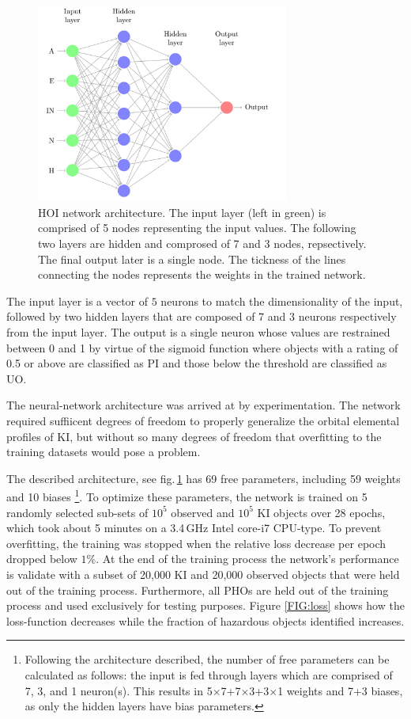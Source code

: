 \documentclass{aa}
\begin{document}
\begin{figure}[t]
    \hspace*{-0.4cm}
	\includegraphics[width=83mm]{images/1_network_hoi.png}
	\centering
	\caption{\label{FIG:HOI_Design} HOI network architecture. The
          input layer (left in green) is comprised of 5 nodes
          representing the input values. The following two layers are
          hidden and comprosed of 7 and 3 nodes, repsectively. The
          final output later is a single node. The tickness of the
          lines connecting the nodes represents the weights in the
          trained network.}
\end{figure}

The input layer is a vector of $5$ neurons to match the dimensionality
of the input, followed by two hidden layers that are composed of 7 and
3 neurons respectively from the input layer. The output is a single
neuron whose values are restrained between 0 and 1 by virtue of the
sigmoid function where objects with a rating of 0.5 or above are
classified as PI and those below the threshold are classified as UO.

The neural-network architecture was arrived at by experimentation.
The network required suffiicent degrees of freedom to properly
generalize the orbital elemental profiles of KI, but without so many
degrees of freedom that overfitting to the training datasets would
pose a problem.

The described architecture, see fig.\,\ref{FIG:HOI_Design} has 69 free
parameters, including 59 weights and 10 biases \footnote{Following the
  architecture described, the number of free parameters can be
  calculated as follows: the input is fed through layers which are
  comprised of 7, 3, and 1 neuron(s). This results in
  5$\times$7+7$\times$3+3$\times$1 weights and 7+3 biases, as only the
  hidden layers have bias parameters.}. To optimize these parameters,
the network is trained on 5 randomly selected sub-sets of $10^5$
observed and $10^5$ KI objects over 28 epochs, which took about 5
minutes on a 3.4\,GHz Intel core-i7 CPU-type. To prevent overfitting,
the training was stopped when the relative loss decrease per epoch
dropped below $1\%$.  At the end of the training process the network's
performance is validate with a subset of 20,000 KI and 20,000 observed
objects that were held out of the training process. Furthermore, all
PHOs are held out of the training process and used exclusively for
testing purposes. Figure \ref{FIG:loss} shows how the loss-function
decreases while the fraction of hazardous objects identified
increases.
\end{document}
